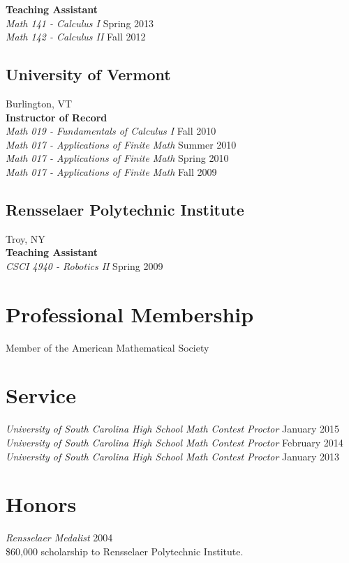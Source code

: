 \documentclass{article}
\begin{document}
  \noindent\textbf{Teaching Assistant}\\
  \textsl{Math 141 - Calculus I} \hfill Spring 2013\\
  \textsl{Math 142 - Calculus II} \hfill Fall 2012\\

  \subsection*{University of Vermont}
  \noindent Burlington, VT\\
  
  \noindent\textbf{Instructor of Record}\\
  \textsl{Math 019 - Fundamentals of Calculus I} \hfill Fall 2010\\
  \textsl{Math 017 - Applications of Finite Math} \hfill Summer 2010\\
  \textsl{Math 017 - Applications of Finite Math} \hfill Spring 2010\\
  \textsl{Math 017 - Applications of Finite Math} \hfill Fall 2009\\
  
  \subsection*{Rensselaer Polytechnic Institute}
  \noindent Troy, NY\\

  \noindent\textbf{Teaching Assistant}\\
  \textsl{CSCI 4940 - Robotics II} \hfill Spring 2009\\

  \section*{Professional Membership}
  Member of the American Mathematical Society
  
  \section*{Service}
  \textsl{University of South Carolina High School Math Contest Proctor} \hfill January 2015\\
  \textsl{University of South Carolina High School Math Contest Proctor} \hfill February 2014\\
  \textsl{University of South Carolina High School Math Contest Proctor} \hfill January 2013

  \section*{Honors}
  \textsl{Rensselaer Medalist} \hfill 2004\\
  \$60,000 scholarship to Rensselaer Polytechnic Institute.
\end{document}
